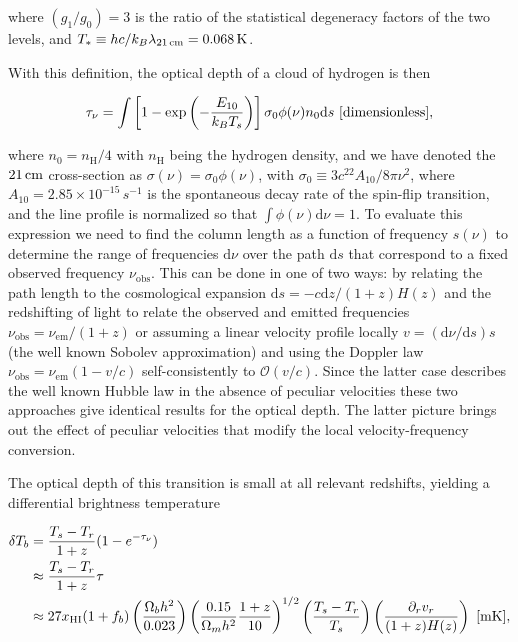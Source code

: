 \documentclass[a4paper,11pt]{article}
\begin{document}
{\noindent}where $(g_1/g_0)=3$ is the ratio of the statistical degeneracy factors of the two levels, and $T_*\equiv hc/k_B\lambda_{21\,\mathrm{cm}}=0.068\,{\rm K}$.

{\noindent}With this definition, the optical depth of a cloud of hydrogen is then

\begin{align*}
    \tau_\nu = \int \left[1-\exp\left(-\frac{E_{10}}{k_BT_s}\right)\right]\sigma_0\phi(\nu)n_0\mathrm{d}s ~ [{\rm dimensionless}],
\end{align*}

{\noindent}where $n_0=n_\mathrm{H}/4$ with $n_\mathrm{H}$ being the hydrogen density, and we have denoted the $21\,{\rm cm}$ cross-section as $\sigma(\nu)=\sigma_0\phi(\nu)$, with $\sigma_0\equiv3c^22A_{10}/8\pi\nu^2$, where $A_{10}=2.85\times10^{-15}\,s^{-1}$ is the spontaneous decay rate of the spin-flip transition, and the line profile is normalized so that $\int\phi(\nu)\mathrm{d}\nu=1$. To evaluate this expression we need to find the column length as a function of frequency $s(\nu)$ to determine the range of frequencies $\mathrm{d}\nu$ over the path $\mathrm{d}s$ that correspond to a fixed observed frequency $\nu_\mathrm{obs}$. This can be done in one of two ways: by relating the path length to the cosmological expansion $\mathrm{d}s=−c\mathrm{d}z/(1+z)H(z)$ and the redshifting of light to relate the observed and emitted frequencies $\nu_\mathrm{obs}=\nu_\mathrm{em}/(1+z)$ or assuming a linear velocity profile locally $v=(\mathrm{d}\nu/\mathrm{d}s)s$ (the well known Sobolev approximation) and using the Doppler law $\nu_\mathrm{obs}=\nu_\mathrm{em}(1-v/c)$ self-consistently to $\mathcal{O}(v/c)$. Since the latter case describes the well known Hubble law in the absence of peculiar velocities these two approaches give identical results for the optical depth. The latter picture brings out the effect of peculiar velocities that modify the local velocity-frequency conversion.

{\noindent}The optical depth of this transition is small at all relevant redshifts, yielding a differential brightness temperature

\begin{align*}
    \delta T_b &= \frac{T_s-T_r}{1+z}(1-e^{-\tau_\nu}) \\
    &\approx \frac{T_s-T_r}{1+z}\tau \\
    &\approx 27x_\mathrm{HI}(1+f_b)\left(\frac{\Omega_bh^2}{0.023}\right)\left(\frac{0.15}{\Omega_mh^2}\frac{1+z}{10}\right)^{1/2}\left(\frac{T_s-T_r}{T_s}\right)\left(\frac{\partial_rv_r}{(1+z)H(z)}\right) ~ [{\rm mK}],
\end{align*}
\end{document}
